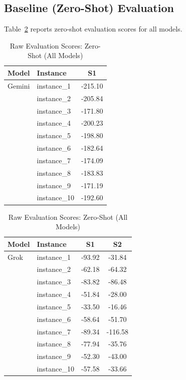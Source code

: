 \documentclass[sigconf]{acmart}
\begin{document}
\subsection{Baseline (Zero-Shot) Evaluation}
\label{app:baseline-scores}

Table~\ref{tab:raw-baseline} reports zero-shot evaluation scores for all models.

\begin{table}[htbp]
\centering
\caption{Raw Evaluation Scores: Zero-Shot (All Models)}
\label{tab:raw-baseline}
\scriptsize
\begin{tabular}{llc}
\toprule
\textbf{Model} & \textbf{Instance} & \textbf{S1} \\
\midrule
Gemini & instance\_1 & -215.10 \\
 & instance\_2 & -205.84 \\
 & instance\_3 & -171.80 \\
 & instance\_4 & -200.23 \\
 & instance\_5 & -198.80 \\
 & instance\_6 & -182.64 \\
 & instance\_7 & -174.09 \\
 & instance\_8 & -183.83 \\
 & instance\_9 & -171.19 \\
 & instance\_10 & -192.60 \\
\bottomrule
\end{tabular}


\begin{tabular}{llcc}
\toprule
\textbf{Model} & \textbf{Instance} & \textbf{S1} & \textbf{S2} \\
\midrule
Grok & instance\_1 & -93.92 & -31.84 \\
 & instance\_2 & -62.18 & -64.32 \\
 & instance\_3 & -83.82 & -86.48 \\
 & instance\_4 & -51.84 & -28.00 \\
 & instance\_5 & -33.50 & -16.46 \\
 & instance\_6 & -58.64 & -51.70 \\
 & instance\_7 & -89.34 & -116.58 \\
 & instance\_8 & -77.94 & -35.76 \\
 & instance\_9 & -52.30 & -43.00 \\
 & instance\_10 & -57.58 & -33.66 \\
\bottomrule
\end{tabular}



\end{table}
\end{document}
